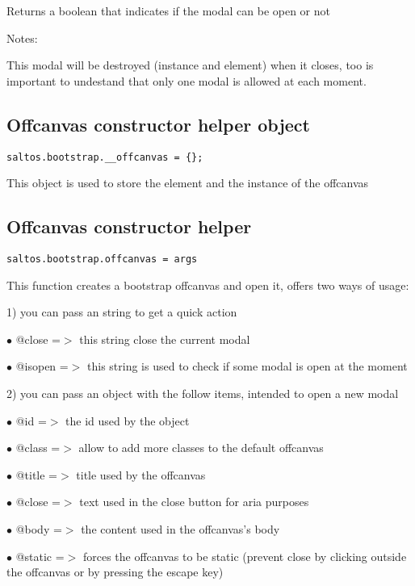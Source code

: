 \documentclass[a4paper]{book}
\begin{document}
Returns a boolean that indicates if the modal can be open or not

Notes:

This modal will be destroyed (instance and element) when it closes, too is important
to undestand that only one modal is allowed at each moment.

\hypertarget{toc475}{}
\subsection{Offcanvas constructor helper object}

\begin{lstlisting}
saltos.bootstrap.__offcanvas = {};
\end{lstlisting}

This object is used to store the element and the instance of the offcanvas

\hypertarget{toc476}{}
\subsection{Offcanvas constructor helper}

\begin{lstlisting}
saltos.bootstrap.offcanvas = args
\end{lstlisting}

This function creates a bootstrap offcanvas and open it, offers two ways of usage:

1) you can pass an string to get a quick action

\begin{compactitem}
\item[\color{myblue}$\bullet$] @close  =$>$ this string close the current modal
\item[\color{myblue}$\bullet$] @isopen =$>$ this string is used to check if some modal is open at the moment
\end{compactitem}

2) you can pass an object with the follow items, intended to open a new modal

\begin{compactitem}
\item[\color{myblue}$\bullet$] @id     =$>$ the id used by the object
\item[\color{myblue}$\bullet$] @class  =$>$ allow to add more classes to the default offcanvas
\item[\color{myblue}$\bullet$] @title  =$>$ title used by the offcanvas
\item[\color{myblue}$\bullet$] @close  =$>$ text used in the close button for aria purposes
\item[\color{myblue}$\bullet$] @body   =$>$ the content used in the offcanvas's body
\item[\color{myblue}$\bullet$] @static =$>$ forces the offcanvas to be static (prevent close by clicking outside the
           offcanvas or by pressing the escape key)
\end{compactitem}
\end{document}
